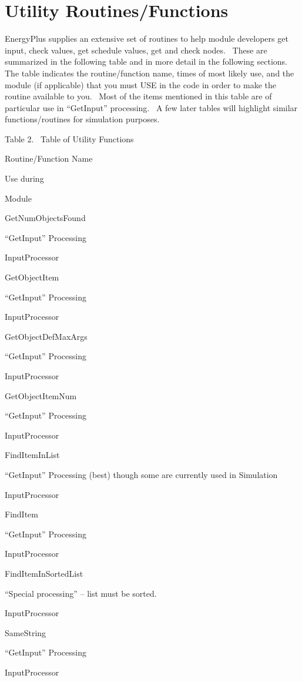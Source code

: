 \section{Utility Routines/Functions}\label{utility-routinesfunctions}

EnergyPlus supplies an extensive set of routines to help module developers get input, check values, get schedule values, get and check nodes.~ These are summarized in the following table and in more detail in the following sections.~ The table indicates the routine/function name, times of most likely use, and the module (if applicable) that you must USE in the code in order to make the routine available to you.~ Most of the items mentioned in this table are of particular use in ``GetInput'' processing.~ A few later tables will highlight similar functions/routines for simulation purposes.

Table 2.~ Table of Utility Functions

Routine/Function Name

Use during

Module

GetNumObjectsFound

``GetInput'' Processing

InputProcessor

GetObjectItem

``GetInput'' Processing

InputProcessor

GetObjectDefMaxArgs

``GetInput'' Processing

InputProcessor

GetObjectItemNum

``GetInput'' Processing

InputProcessor

FindItemInList

``GetInput'' Processing (best) though some are currently used in Simulation

InputProcessor

FindItem

``GetInput'' Processing

InputProcessor

FindItemInSortedList

``Special processing'' -- list must be sorted.

InputProcessor

SameString

``GetInput'' Processing

InputProcessor

